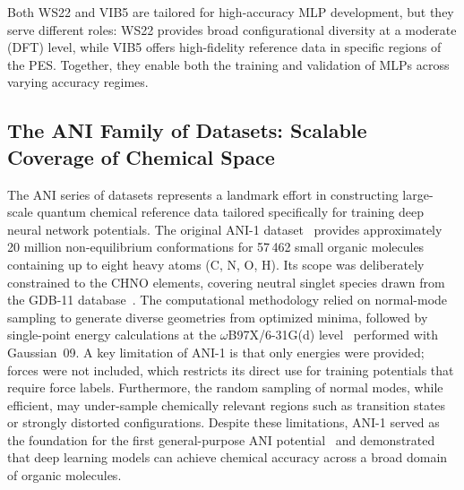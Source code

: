 \documentclass[12pt]{article}
\begin{document}
Both WS22 and VIB5 are tailored for high-accuracy MLP development, but they serve different roles: WS22 provides broad configurational diversity at a moderate (DFT) level, while VIB5 offers high-fidelity reference data in specific regions of the PES. Together, they enable both the training and validation of MLPs across varying accuracy regimes.

\subsection{The ANI Family of Datasets: Scalable Coverage of Chemical Space}\label{sec:ani-family}

The ANI series of datasets represents a landmark effort in constructing large-scale quantum chemical reference data tailored specifically for training deep neural network potentials. The original ANI-1 dataset~\cite{ds25-7} provides approximately 20 million non-equilibrium conformations for 57\,462 small organic molecules containing up to eight heavy atoms (C, N, O, H). Its scope was deliberately constrained to the CHNO elements, covering neutral singlet species drawn from the GDB-11 database~\cite{ds25-95,ds25-96}. The computational methodology relied on normal-mode sampling to generate diverse geometries from optimized minima, followed by single-point energy calculations at the \(\omega\)B97X/6-31G(d) level~\cite{ds25-56} performed with Gaussian~09. A key limitation of ANI-1 is that only energies were provided; forces were not included, which restricts its direct use for training potentials that require force labels. Furthermore, the random sampling of normal modes, while efficient, may under-sample chemically relevant regions such as transition states or strongly distorted configurations. Despite these limitations, ANI-1 served as the foundation for the first general-purpose ANI potential~\cite{ds25-138} and demonstrated that deep learning models can achieve chemical accuracy across a broad domain of organic molecules.
\end{document}
